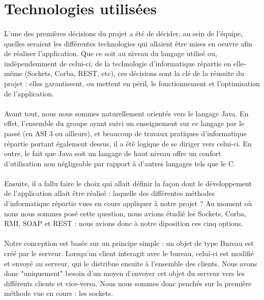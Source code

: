 \section{Technologies utilisées}

\paragraph{}
L'une des premières décisions du projet a été de décider, au sein de l'équipe, quelles seraient les différentes technologies qui allaient être mises en oeuvre afin de réaliser l'application. Que ce soit au niveau du langage utilisé ou, indépendemment de celui-ci, de la technologie d'informatique répartie en elle-même (Sockets, Corba, REST, etc), ces décisions sont la clé de la réussite du projet : elles garantissent, ou mettent en péril, le fonctionnement et l'optimisation de l'application.

\paragraph{}
Avant tout, nous nous sommes naturellement orientés vers le langage Java. En effet, l'ensemble du groupe ayant suivi un enseignement sur ce langage par le passé (en ASI 3 ou ailleurs), et beaucoup de travaux pratiques d'informatique répartie portant également dessus, il a été logique de se diriger vers celui-ci. En outre, le fait que Java soit un langage de haut niveau offre un confort d'utilisation non négligeable par rapport à d'autres langages tels que le C.

\paragraph{}
Ensuite, il a fallu faire le choix qui allait définir la façon dont le développement de l'application allait être réalisé : laquelle des différentes méthodes d'informatique répartie vues en cours appliquer à notre projet ? Au moment où nous nous sommes posé cette question, nous avions étudié les Sockets, Corba, RMI, SOAP et REST : nous avions donc à notre diposition ces cinq options.

\paragraph{}
Notre conception est basée sur un principe simple : un objet de type Bureau est créé par le serveur. Lorsqu'un client interagit avec le bureau, celui-ci est modifié et envoyé au serveur, qui le distribue ensuite à l'ensemble des clients. Nous avons donc "uniquement" besoin d'un moyen d'envoyer cet objet du serveur vers les différents clients et vice-versa. Nous nous sommes donc penchés sur la première méthode vue en cours : les sockets.

